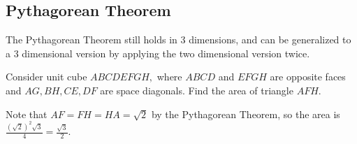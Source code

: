 \subsection{Pythagorean Theorem}
The Pythagorean Theorem still holds in 3 dimensions, and can be generalized to a 3 dimensional version by applying the two dimensional version twice.

\begin{exam}
Consider unit cube $ABCDEFGH,$ where $ABCD$ and $EFGH$ are opposite faces and $AG,BH,CE,DF$ are space diagonals. Find the area of triangle $AFH.$
\end{exam}

\begin{sol}
Note that $AF=FH=HA=\sqrt{2}$ by the Pythagorean Theorem, so the area is $\frac{(\sqrt{2})^2\sqrt{3}}{4}=\frac{\sqrt{3}}{2}.$
\end{sol}

